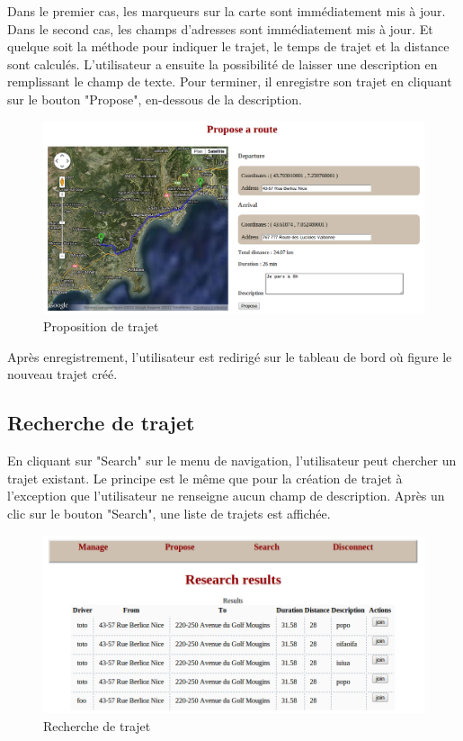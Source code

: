 \documentclass[a4paper]{article}
\begin{document}
Dans le premier cas, les marqueurs sur la carte sont immédiatement mis à jour. Dans le second cas, les champs d'adresses sont immédiatement mis à jour.
Et quelque soit la méthode pour indiquer le trajet, le temps de trajet et la distance sont calculés.
L'utilisateur a ensuite la possibilité de laisser une description en remplissant le champ de texte.
Pour terminer, il enregistre son trajet en cliquant sur le bouton "Propose", en-dessous de la description.

\begin{figure}[!ht]
	\centering
	\includegraphics[scale=0.4]{Propose.png}
	\caption{\label{propose} Proposition de trajet}
\end{figure}

Après enregistrement, l'utilisateur est redirigé sur le tableau de bord où figure le nouveau trajet créé.

\subsection{Recherche de trajet}

En cliquant sur "Search" sur le menu de navigation, l'utilisateur peut chercher un trajet existant. Le principe est le même que pour la création
de trajet à l'exception que l'utilisateur ne renseigne aucun champ de description. Après un clic sur le bouton "Search", une liste de trajets
est affichée. 

\begin{figure}[!ht]
	\centering
	\includegraphics[scale=0.5]{Search.png}
	\caption{\label{search} Recherche de trajet}
\end{figure}
\end{document}
